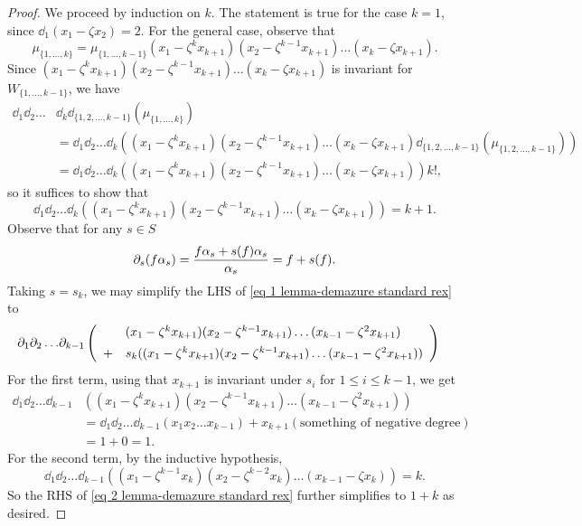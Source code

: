\begin{proof}
    \noindent We proceed by induction on $k$. The statement is true for the case $k=1$, since $\dd_1(x_1-\zeta x_2)=2$. For the general case, observe that    
    $$\mu_{\{1,\ldots,k\}} = \mu_{\{1,\ldots,k-1\}}(x_1-\zeta^kx_{k+1})(x_2-\zeta^{k-1}x_{k+1})\ldots (x_k -\zeta x_{k+1}).$$
    Since $(x_1-\zeta^kx_{k+1})(x_2-\zeta^{k-1}x_{k+1})\ldots (x_k -\zeta x_{k+1})$ is invariant for $W_{\{1,\ldots, k-1\}}$, we have
     \begin{align*}
     \dd_1\dd_2\ldots &\dd_k \dd_{\{1,2,\ldots , k-1\}}(\mu_{\{1,\ldots,k\}}) \\
     &= \dd_1 \dd_2 \ldots \dd_k\left(
     (x_1-\zeta^kx_{k+1})(x_2-\zeta^{k-1}x_{k+1})\ldots (x_k -\zeta x_{k+1})
          \dd_{\{1,2,\ldots , k-1\}}(\mu_{\{1,2,\ldots , k-1\}})
     \right)\\
     &=\dd_1\dd_2\ldots \dd_k\left((x_1-\zeta^kx_{k+1})(x_2-\zeta^{k-1}x_{k+1})\ldots (x_k -\zeta x_{k+1})\right)k!,
     \end{align*}
     so it suffices to show that
     \begin{equation} 
     \dd_1\dd_2\ldots \dd_k\left((x_1-\zeta^kx_{k+1})(x_2-\zeta^{k-1}x_{k+1})\ldots (x_k -\zeta x_{k+1})\right)=k+1.\label{eq 1 lemma-demazure standard rex}
     \end{equation}
    Observe that for any $s \in S$ $$\partial_s(f\alpha_s)= \frac{f\alpha_s+s(f)\alpha_s}{\alpha_s}=f+s(f).$$
    Taking $s=s_k$, we may simplify the LHS of \cref{eq 1 lemma-demazure standard rex} to
    \begin{align}
     \dd_1\dd_2\ldots &\dd_{k-1}\left(
     \begin{array}{c}
     (x_1-\zeta^kx_{k+1})(x_2-\zeta^{k-1}x_{k+1})\ldots (x_{k-1} -\zeta^2 x_{k+1})\vspace{5 pt}\\
     +\quad s_k((x_1-\zeta^k x_{k+1})(x_2-\zeta^{k-1}x_{k+1})\ldots (x_{k-1} -\zeta^2 x_{k+1}))
     \end{array}
     \right)  
     \label{eq 2 lemma-demazure standard rex}
    \end{align}
    For the first term, using that $x_{k+1}$ is invariant under $s_i$ for $1 \le i \le k-1$, we get
    \begin{align*}\dd_1\dd_2\ldots \dd_{k-1}&((x_1-\zeta^kx_{k+1})(x_2-\zeta^{k-1}x_{k+1})\ldots (x_{k-1} -\zeta^2 x_{k+1}))\\
    &=\dd_1\dd_2\ldots \dd_{k-1}(x_1x_2\ldots x_{k-1}) + x_{k+1}(\text{something of negative degree})\\
    &=1+0=1.
    \end{align*}
    For the second term, by the inductive hypothesis,
    $$\dd_1\dd_2\ldots \dd_{k-1}\left((x_1-\zeta^{k-1} x_{k})(x_2-\zeta^{k-2}x_{k})\ldots (x_{k-1} -\zeta x_{k})\right)=k.$$
    So the RHS of \cref{eq 2 lemma-demazure standard rex} further simplifies to $1+k$ as desired.
\end{proof}

